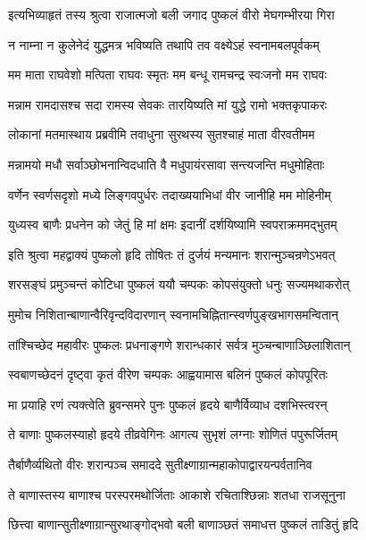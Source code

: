 \twolineshloka
{इत्यभिव्याहृतं तस्य श्रुत्वा राजात्मजो बली}
{जगाद पुष्कलं वीरो मेघगम्भीरया गिरा}%


\twolineshloka
{न नाम्ना न कुलेनेदं युद्धमत्र भविष्यति}
{तथापि तव वक्ष्येऽहं स्वनामबलपूर्वकम्}%

\twolineshloka
{मम माता राघवेशो मत्पिता राघवः स्मृतः}
{मम बन्धू रामचन्द्र स्वःजनो मम राघवः}%

\twolineshloka
{मन्नाम रामदासश्च सदा रामस्य सेवकः}
{तारयिष्यति मां युद्धे रामो भक्तकृपाकरः}%

\twolineshloka
{लोकानां मतमास्थाय प्रब्रवीमि तवाधुना}
{सुरथस्य सुतश्चाहं माता वीरवतीमम}%

\twolineshloka
{मन्नामयो मधौ सर्वाञ्छोभनान्विदधाति वै}
{मधुपायंरसावा सन्त्यजन्ति मधुमोहिताः}%

\twolineshloka
{वर्णेन स्वर्णसदृशो मध्ये लिङ्गवपुर्धरः}
{तदाख्ययाभिधां वीर जानीहि मम मोहिनीम्}%

\twolineshloka
{युध्यस्व बाणैः प्रधनेन को जेतुं हि मां क्षमः}
{इदानीं दर्शयिष्यामि स्वपराक्रममद्भुतम्}%


\twolineshloka
{इति श्रुत्वा महद्वाक्यं पुष्कलो हृदि तोषितः}
{तं दुर्जयं मन्यमानः शरान्मुञ्चन्रणेऽभवत्}%

\twolineshloka
{शरसङ्घं प्रमुञ्चन्तं कोटिधा पुष्कलं ययौ}
{चम्पकः कोपसंयुक्तो धनुः सज्यमथाकरोत्}%

\twolineshloka
{मुमोच निशितान्बाणान्वैरिवृन्दविदारणान्}
{स्वनामचिह्नितान्स्वर्णपुङ्खभागसमन्वितान्}%

\twolineshloka
{तांश्चिच्छेद महावीरः पुष्कलः प्रधनाङ्गणे}
{शरान्धकारं सर्वत्र मुञ्चन्बाणाञ्छिलाशितान्}%

\twolineshloka
{स्वबाणच्छेदनं दृष्ट्वा कृतं वीरेण चम्पकः}
{आह्वयामास बलिनं पुष्कलं कोपपूरितः}%

\twolineshloka
{मा प्रयाहि रणं त्यक्त्वेति ब्रुवन्समरे पुनः}
{पुष्कलं हृदये बाणैर्विव्याध दशभिस्त्वरन्}%

\twolineshloka
{ते बाणाः पुष्कलस्याहो हृदये तीव्रवेगिनः}
{आगत्य सुभृशं लग्नाः शोणितं पपुरूर्जितम्}%

\twolineshloka
{तैर्बाणैर्व्यथितो वीरः शरान्पञ्च समाददे}
{सुतीक्ष्णाग्रान्महाकोपाद्वारयन्पर्वतानिव}%

\twolineshloka
{ते बाणास्तस्य बाणाश्च परस्परमथोर्जिताः}
{आकाशे रचिताश्छिन्नाः शतधा राजसूनुना}%

\twolineshloka
{छित्त्वा बाणान्सुतीक्ष्णाग्रान्सुरथाङ्गोद्भवो बली}
{बाणाञ्छतं समाधत्त पुष्कलं ताडितुं हृदि}%

